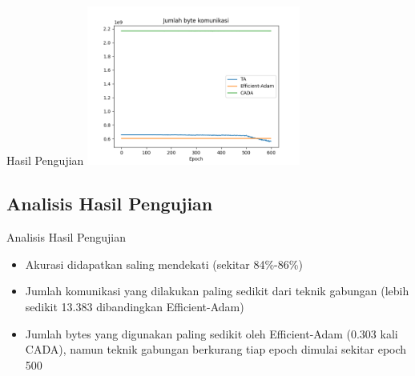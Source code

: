 \documentclass[aspectratio=169]{beamer}
\begin{document}
\begin{frame}{Hasil Pengujian}
  \includegraphics[width=7cm]{bits.png}
\end{frame}

\subsection{Analisis Hasil Pengujian}
\begin{frame}{Analisis Hasil Pengujian}
  \begin{itemize}
    \item Akurasi didapatkan saling mendekati (sekitar 84\%-86\%)
    \item Jumlah komunikasi yang dilakukan paling sedikit dari teknik gabungan (lebih sedikit 13.383 dibandingkan Efficient-Adam)
    \item Jumlah bytes yang digunakan paling sedikit oleh Efficient-Adam (0.303 kali CADA), namun teknik gabungan berkurang tiap epoch dimulai sekitar epoch 500
  \end{itemize}
\end{frame}
\end{document}

